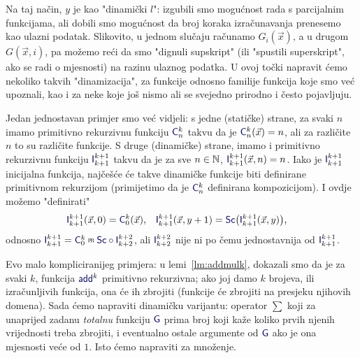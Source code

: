 Na taj način, $y$ je kao "dinamički $l$": izgubili smo mogućnost rada s parcijalnim funkcijama, ali dobili smo mogućnost da broj koraka izračunavanja prenesemo kao ulazni podatak. Slikovito, u jednom slučaju računamo $G_i(\vec x)$, a u drugom $G(\vec x,i)$, pa možemo reći da smo "dignuli supskript" (ili "spustili superskript", ako se radi o mjesnosti) na razinu ulaznog podatka. U ovoj točki napravit ćemo nekoliko takvih "dinamizacija", za funkcije odnosno familije funkcija koje smo već upoznali, kao i za neke koje još nismo ali se svejedno prirodno i često pojavljuju.

\begin{primjer}[{name=[koordinantna projekcija kao dinamizacija konstantnih funkcija]}]
Jedan jednostavan primjer smo već vidjeli: s jedne (statičke) strane, za svaki $n$ imamo primitivno rekurzivnu funkciju $\f C_n^k$ takvu da je $\f C_n^k(\vec x)=n$, ali za različite $n$ to su različite funkcije. S druge (dinamičke) strane, imamo i primitivno rekurzivnu funkciju $\f I_{k+1}^{k+1}$ takvu da je za sve $n\in{\mathbb N}$, $\f I_{k+1}^{k+1}(\vec x,n)=n$. Iako je $\f I_{k+1}^{k+1}$ inicijalna funkcija, najčešće će takve dinamičke funkcije biti definirane primitivnom rekurzijom (primijetimo da je $\f C_n^k$ definirana kompozicijom). I ovdje možemo "definirati"
\begin{align}
    \f I_{k+1}^{k+1}(\vec x,0)&=\f C_0^k(\vec x)\text,&
    \f I_{k+1}^{k+1}(\vec x,y+1)&=\f{Sc}\bigl(\f I_{k+1}^{k+1}(\vec x,y)\bigr)\text,
\end{align}
odnosno $\f I_{k+1}^{k+1}=\f C_0^k\pr\f{Sc}\circ\f I_{k+2}^{k+2}$, ali $\f I_{k+2}^{k+2}$ nije ni po čemu jednostavnija od $\f I_{k+1}^{k+1}$.
\end{primjer}



Evo malo kompliciranijeg primjera: u lemi~\ref{lm:addmulk}, dokazali smo da je za svaki $k$, funkcija $\f{add}^k$ primitivno rekurzivna; ako joj damo $k$ brojeva, ili izračunljivih funkcija, ona će ih zbrojiti (funkcije će zbrojiti na presjeku njihovih domena). Sada ćemo napraviti dinamičku varijantu: operator $\sum$ koji za unaprijed zadanu \emph{totalnu} funkciju $\f G$ prima broj koji kaže koliko prvih njenih vrijednosti treba zbrojiti, i eventualno ostale argumente od $\f G$ ako je ona mjesnosti veće od $1$. Isto ćemo napraviti za množenje.

